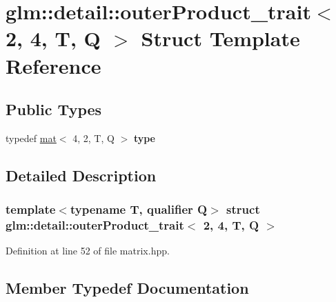 \hypertarget{structglm_1_1detail_1_1outerProduct__trait_3_012_00_014_00_01T_00_01Q_01_4}{}\section{glm\+:\+:detail\+:\+:outer\+Product\+\_\+trait$<$ 2, 4, T, Q $>$ Struct Template Reference}
\label{structglm_1_1detail_1_1outerProduct__trait_3_012_00_014_00_01T_00_01Q_01_4}
\subsection*{Public Types}
\begin{DoxyCompactItemize}
\item 
\mbox{\label{structglm_1_1detail_1_1outerProduct__trait_3_012_00_014_00_01T_00_01Q_01_4_a25bc2e0604357ef39ab2a35015b1f9c8}} 
typedef \hyperlink{structglm_1_1mat}{mat}$<$ 4, 2, T, Q $>$ {\bfseries type}
\end{DoxyCompactItemize}


\subsection{Detailed Description}
\subsubsection*{template$<$typename T, qualifier Q$>$\newline
struct glm\+::detail\+::outer\+Product\+\_\+trait$<$ 2, 4, T, Q $>$}



Definition at line 52 of file matrix.\+hpp.



\subsection{Member Typedef Documentation}
\mbox{\label{structglm_1_1detail_1_1outerProduct__trait_3_012_00_014_00_01T_00_01Q_01_4_a25bc2e0604357ef39ab2a35015b1f9c8}} 
